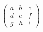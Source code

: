 \documentclass[preview]{standalone}
\begin{document}
\begin{align*}
\begin{pmatrix} a & b & c \\ d & e & f \\ g & h & i \end{pmatrix}
\end{align*}
\end{document}
